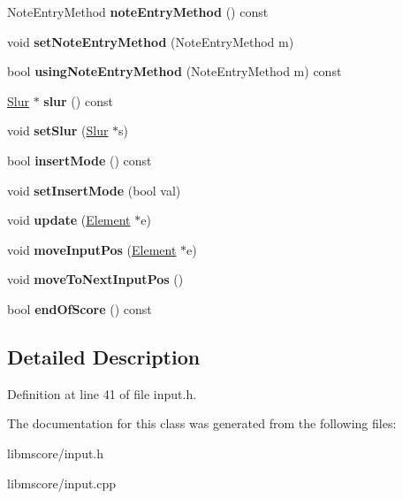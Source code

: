 \begin{DoxyCompactItemize}
Note\+Entry\+Method {\bfseries note\+Entry\+Method} () const
\item 
\mbox{\label{class_ms_1_1_input_state_a1ed5a4881a58cf3c02cfb93ac8380132}} 
void {\bfseries set\+Note\+Entry\+Method} (Note\+Entry\+Method m)
\item 
\mbox{\label{class_ms_1_1_input_state_a317166f3795ace112c72ccdcdcb0b259}} 
bool {\bfseries using\+Note\+Entry\+Method} (Note\+Entry\+Method m) const
\item 
\mbox{\label{class_ms_1_1_input_state_aa3c2705f1c6bbae2937ff66e367da527}} 
\hyperlink{class_ms_1_1_slur}{Slur} $\ast$ {\bfseries slur} () const
\item 
\mbox{\label{class_ms_1_1_input_state_af31048b03da7dd0dab6554f8acd8e399}} 
void {\bfseries set\+Slur} (\hyperlink{class_ms_1_1_slur}{Slur} $\ast$s)
\item 
\mbox{\label{class_ms_1_1_input_state_aad241261e33834b4692b8670665d33b0}} 
bool {\bfseries insert\+Mode} () const
\item 
\mbox{\label{class_ms_1_1_input_state_aece96c5046ec10df90ed461083b37073}} 
void {\bfseries set\+Insert\+Mode} (bool val)
\item 
\mbox{\label{class_ms_1_1_input_state_a02b78e74e5df25942c100c4d5df16cb3}} 
void {\bfseries update} (\hyperlink{class_ms_1_1_element}{Element} $\ast$e)
\item 
\mbox{\label{class_ms_1_1_input_state_a278152d72bc40674c048dd9cc452af37}} 
void {\bfseries move\+Input\+Pos} (\hyperlink{class_ms_1_1_element}{Element} $\ast$e)
\item 
\mbox{\label{class_ms_1_1_input_state_ac2992a6014b8bfb377796e3300562ee4}} 
void {\bfseries move\+To\+Next\+Input\+Pos} ()
\item 
\mbox{\label{class_ms_1_1_input_state_a70dd9ba8377e509f895bbd74deb25f7b}} 
bool {\bfseries end\+Of\+Score} () const
\end{DoxyCompactItemize}


\subsection{Detailed Description}


Definition at line 41 of file input.\+h.



The documentation for this class was generated from the following files\+:\begin{DoxyCompactItemize}
\item 
libmscore/input.\+h\item 
libmscore/input.\+cpp\end{DoxyCompactItemize}
